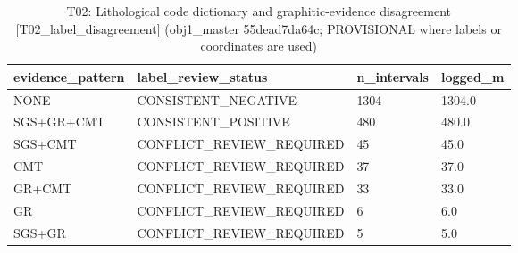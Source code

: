 \begin{table}[htbp]
\centering
\caption{T02: Lithological code dictionary and graphitic-evidence disagreement [T02\_label\_disagreement] (obj1\_master 55dead7da64c; PROVISIONAL where labels or coordinates are used)}
\begin{tabular}{llll}
\toprule
evidence\_pattern & label\_review\_status & n\_intervals & logged\_m \\
\midrule
NONE & CONSISTENT\_NEGATIVE & 1304 & 1304.0 \\
SGS+GR+CMT & CONSISTENT\_POSITIVE & 480 & 480.0 \\
SGS+CMT & CONFLICT\_REVIEW\_REQUIRED & 45 & 45.0 \\
CMT & CONFLICT\_REVIEW\_REQUIRED & 37 & 37.0 \\
GR+CMT & CONFLICT\_REVIEW\_REQUIRED & 33 & 33.0 \\
GR & CONFLICT\_REVIEW\_REQUIRED & 6 & 6.0 \\
SGS+GR & CONFLICT\_REVIEW\_REQUIRED & 5 & 5.0 \\
\bottomrule
\end{tabular}
\end{table}
